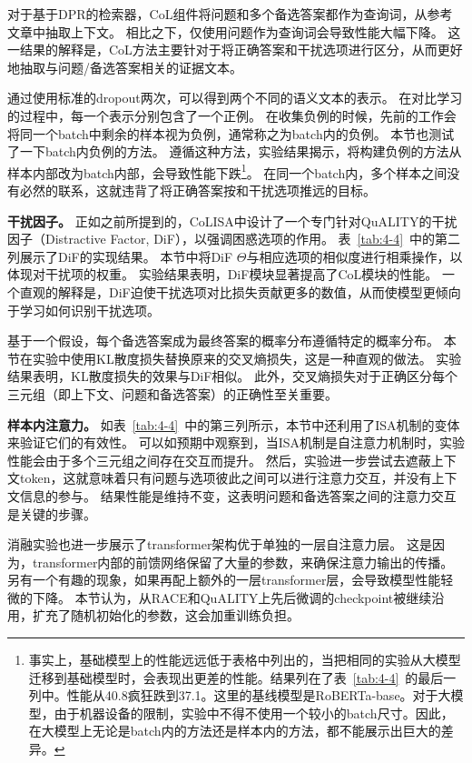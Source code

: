 对于基于DPR的检索器，CoL组件将问题和多个备选答案都作为查询词，从参考文章中抽取上下文。
相比之下，仅使用问题作为查询词会导致性能大幅下降。
这一结果的解释是，CoL方法主要针对于将正确答案和干扰选项进行区分，从而更好地抽取与问题/备选答案相关的证据文本。

通过使用标准的dropout两次，可以得到两个不同的语义文本的表示。
在对比学习的过程中，每一个表示分别包含了一个正例。
在收集负例的时候，先前的工作会将同一个batch中剩余的样本视为负例，通常称之为batch内的负例\cite{gao2021simcse}。
本节也测试了一下batch内负例的方法。
遵循这种方法，实验结果揭示，将构建负例的方法从样本内部改为batch内部，会导致性能下跌\footnote{事实上，基础模型上的性能远远低于表格中列出的，当把相同的实验从大模型迁移到基础模型时，会表现出更差的性能。结果列在了表~\ref{tab:4-4}~的最后一列中。性能从40.8疯狂跌到37.1。这里的基线模型是RoBERTa-base。对于大模型，由于机器设备的限制，实验中不得不使用一个较小的batch尺寸。因此，在大模型上无论是batch内的方法还是样本内的方法，都不能展示出巨大的差异。}。
在同一个batch内，多个样本之间没有必然的联系，这就违背了将正确答案按和干扰选项推远的目标。

\textbf{干扰因子。}
正如之前所提到的，CoLISA中设计了一个专门针对QuALITY的干扰因子（Distractive Factor, DiF），以强调困惑选项的作用。
表~\ref{tab:4-4}~中的第二列展示了DiF的实现结果。
本节中将DiF $\Theta$与相应选项的相似度进行相乘操作，以体现对干扰项的权重。
实验结果表明，DiF模块显著提高了CoL模块的性能。
一个直观的解释是，DiF迫使干扰选项对比损失贡献更多的数值，从而使模型更倾向于学习如何识别干扰选项。

基于一个假设，每个备选答案成为最终答案的概率分布遵循特定的概率分布。
本节在实验中使用KL散度损失\cite{hershey2007approximating}替换原来的交叉熵损失，这是一种直观的做法。
实验结果表明，KL散度损失的效果与DiF相似。
此外，交叉熵损失对于正确区分每个三元组（即上下文、问题和备选答案）的正确性至关重要。

\textbf{样本内注意力。}
如表~\ref{tab:4-4}~中的第三列所示，本节中还利用了ISA机制的变体来验证它们的有效性。
可以如预期中观察到，当ISA机制是自注意力机制时，实验性能会由于多个三元组之间存在交互而提升。
然后，实验进一步尝试去遮蔽上下文token，这就意味着只有问题与选项彼此之间可以进行注意力交互，并没有上下文信息的参与。
结果性能是维持不变，这表明问题和备选答案之间的注意力交互是关键的步骤。

消融实验也进一步展示了transformer架构优于单独的一层自注意力层。
这是因为，transformer内部的前馈网络保留了大量的参数，来确保注意力输出的传播。
另有一个有趣的现象，如果再配上额外的一层transformer层，会导致模型性能轻微的下降。
本节认为，从RACE和QuALITY上先后微调的checkpoint被继续沿用，扩充了随机初始化的参数，这会加重训练负担。

